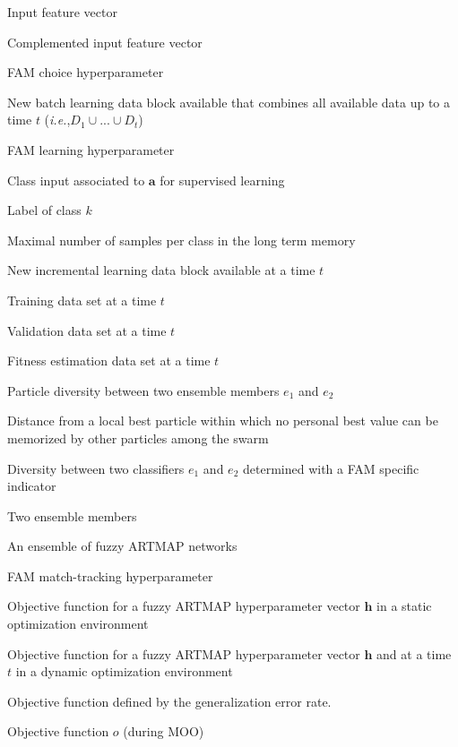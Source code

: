 \item [$\textbf{a}$] Input feature vector
\item [$\textbf{A}$] Complemented input feature vector
\item [$\alpha$] FAM choice hyperparameter
\item [$B_t$] New batch learning data block available that combines all available data up to a time $t$ (\emph{i.e.},$D_1 \cup ... \cup D_t$)
\item [$\beta$] FAM learning hyperparameter
\item [$\mathbf{c}$] Class input associated to $\textbf{a}$ for supervised learning
\item [$C_k$] Label of class $k$
\item [$|C_k|_\mathbf{LTM}$] Maximal number of samples per class in the long term memory
\item [$D_t$] New incremental learning data block available at a time $t$
\item [$D_t^\text{t}$] Training data set at a time $t$
\item [$D_t^\text{v}$] Validation data set at a time $t$
\item [$D_t^\text{f}$] Fitness estimation data set at a time $t$
\item [$\delta_{e_1e_2}$] Particle diversity between two ensemble members $e_1$ and $e_2$
\item [$\Delta$] Distance from a local best particle within which no personal best value can be memorized by other particles among the swarm
\item [$\Delta\theta_{e_1e_2}$] Diversity between two classifiers $e_1$ and $e_2$ determined with a FAM specific indicator
\item [$e_1,e_2$] Two ensemble members
\item [$\textit{EoFAM}$] An ensemble of fuzzy ARTMAP networks
\item [$\epsilon$] FAM match-tracking hyperparameter
\item [$f(\textbf{h})$] Objective function for a fuzzy ARTMAP hyperparameter vector $\textbf{h}$ in a static optimization environment
\item [$f(\textbf{h},t)$] Objective function for a fuzzy ARTMAP hyperparameter vector $\textbf{h}$ and at a time $t$ in a dynamic optimization environment
\item [$f_e(\mathbf{h},t)$] Objective function defined by the generalization error rate.
\item [$f_o(\textbf{h}_n,t)$] Objective function $o$ (during MOO)
